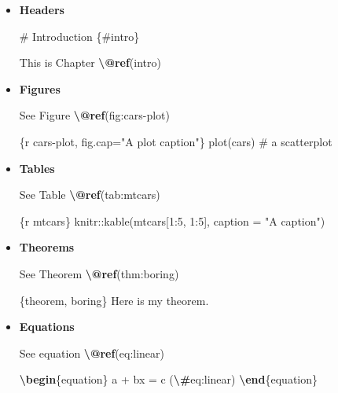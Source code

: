 \documentclass[
  a4paper,
  twoside,
  openright]{book}
\newenvironment{Shaded}{\begin{snugshade}}{\end{snugshade}}
\newcommand{\ExtensionTok}[1]{#1}
\newcommand{\FunctionTok}[1]{\textcolor[rgb]{0.13,0.29,0.53}{\textbf{#1}}}
\newcommand{\KeywordTok}[1]{\textcolor[rgb]{0.13,0.29,0.53}{\textbf{#1}}}
\newcommand{\NormalTok}[1]{#1}
\newcommand{\SpecialCharTok}[1]{\textcolor[rgb]{0.81,0.36,0.00}{\textbf{#1}}}
\newcommand{\SpecialStringTok}[1]{\textcolor[rgb]{0.31,0.60,0.02}{#1}}
\theoremstyle{definition}
\theoremstyle{definition}
\theoremstyle{definition}
\theoremstyle{definition}
\theoremstyle{remark}
\begin{document}
\begin{itemize}
\item
  \textbf{Headers}

\begin{Shaded}
\begin{Highlighting}[]
\NormalTok{\# Introduction \{\#intro\}}

\NormalTok{This is Chapter }\FunctionTok{\textbackslash{}@ref}\NormalTok{(intro)}
\end{Highlighting}
\end{Shaded}
\item
  \textbf{Figures}

\begin{Shaded}
\begin{Highlighting}[]
\NormalTok{See Figure }\FunctionTok{\textbackslash{}@ref}\NormalTok{(fig:cars{-}plot)}

\NormalTok{\textasciigrave{}\textasciigrave{}\textasciigrave{}\{r cars{-}plot, fig.cap="A plot caption"\}}
\NormalTok{plot(cars)  \# a scatterplot}
\NormalTok{\textasciigrave{}\textasciigrave{}\textasciigrave{}}
\end{Highlighting}
\end{Shaded}
\item
  \textbf{Tables}

\begin{Shaded}
\begin{Highlighting}[]
\NormalTok{See Table }\FunctionTok{\textbackslash{}@ref}\NormalTok{(tab:mtcars)}

\NormalTok{\textasciigrave{}\textasciigrave{}\textasciigrave{}\{r mtcars\}}
\NormalTok{knitr::kable(mtcars[1:5, 1:5], caption = "A caption")}
\NormalTok{\textasciigrave{}\textasciigrave{}\textasciigrave{}}
\end{Highlighting}
\end{Shaded}
\item
  \textbf{Theorems}

\begin{Shaded}
\begin{Highlighting}[]
\NormalTok{See Theorem }\FunctionTok{\textbackslash{}@ref}\NormalTok{(thm:boring)}

\NormalTok{\textasciigrave{}\textasciigrave{}\textasciigrave{}\{theorem, boring\}}
\NormalTok{Here is my theorem.}
\NormalTok{\textasciigrave{}\textasciigrave{}\textasciigrave{}}
\end{Highlighting}
\end{Shaded}
\item
  \textbf{Equations}

\begin{Shaded}
\begin{Highlighting}[]
\NormalTok{See equation }\FunctionTok{\textbackslash{}@ref}\NormalTok{(eq:linear)}

\KeywordTok{\textbackslash{}begin}\NormalTok{\{}\ExtensionTok{equation}\NormalTok{\}}
\SpecialStringTok{a + bx = c  (}\SpecialCharTok{\textbackslash{}\#}\SpecialStringTok{eq:linear)}
\KeywordTok{\textbackslash{}end}\NormalTok{\{}\ExtensionTok{equation}\NormalTok{\}}
\end{Highlighting}
\end{Shaded}
\end{itemize}
\end{document}
